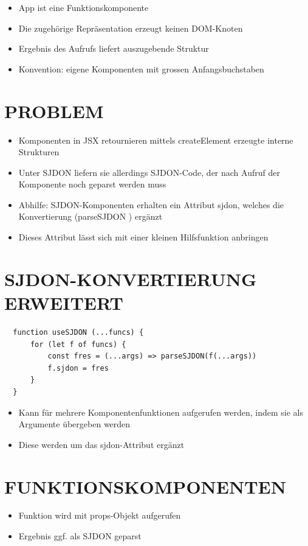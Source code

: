   \begin{itemize}
    \item App ist eine Funktionskomponente
    \item Die zugehörige Repräsentation erzeugt keinen DOM-Knoten
    \item Ergebnis des Aufrufs liefert auszugebende Struktur
    \item Konvention: eigene Komponenten mit grossen Anfangsbuchstaben
  \end{itemize}
  
  \section*{PROBLEM}
  \begin{itemize}
    \item Komponenten in JSX retournieren mittels createElement erzeugte interne Strukturen
    \item Unter SJDON liefern sie allerdings SJDON-Code, der nach Aufruf der Komponente noch geparst werden muss
    \item Abhilfe: SJDON-Komponenten erhalten ein Attribut sjdon, welches die Konvertierung (parseSJDON ) ergänzt
    \item Dieses Attribut lässt sich mit einer kleinen Hilfsfunktion anbringen
  \end{itemize}
  
  \section*{SJDON-KONVERTIERUNG ERWEITERT}
  \begin{verbatim}
  function useSJDON (...funcs) {
      for (let f of funcs) {
          const fres = (...args) => parseSJDON(f(...args))
          f.sjdon = fres
      }
  }
  \end{verbatim}
  
  \begin{itemize}
    \item Kann für mehrere Komponentenfunktionen aufgerufen werden, indem sie als Argumente übergeben werden
    \item Diese werden um das sjdon-Attribut ergänzt
  \end{itemize}
  
  \section*{FUNKTIONSKOMPONENTEN}
  \begin{itemize}
    \item Funktion wird mit props-Objekt aufgerufen
    \item Ergebnis ggf. als SJDON geparst
  \end{itemize}
  

